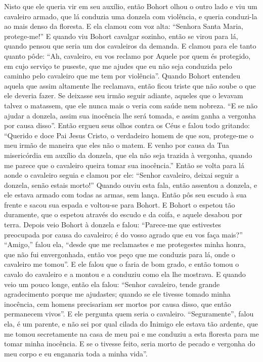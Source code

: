 Nisto que ele queria vir em seu auxílio, então Bohort olhou o outro lado e viu
um cavaleiro armado, que lá conduzia uma donzela com violência, e queria
conduzi-la ao mais denso da floresta. E ela clamou com voz alta: “Senhora Santa
Maria, protege-me!” E quando viu Bohort cavalgar sozinho, então se virou para
lá, quando pensou que seria um dos cavaleiros da demanda. E clamou para ele
tanto quanto pôde: “Ah, cavaleiro, eu vos reclamo por Aquele por quem és
protegido, em cujo serviço te puseste, que me ajudes que eu não seja conduzida
pelo caminho pelo cavaleiro que me tem por violência”. Quando Bohort entendeu
aquela que assim altamente lhe reclamava, então ficou triste que não soube o
que ele deveria fazer. Se deixasse seu irmão seguir adiante, aqueles que o
levavam talvez o matassem, que ele nunca mais o veria com saúde nem nobreza. “E
se não ajudar a donzela, assim sua inocência lhe será tomada, e assim ganha a
vergonha por causa disso”. Então ergueu seus olhos contra os Céus e falou todo
gritando: “Querido e doce Pai Jesus Cristo, o verdadeiro homem de que sou,
protege-me o meu irmão de maneira que eles não o matem. E venho por causa da
Tua misericórdia em auxílio da donzela, que ela não seja trazida à vergonha,
quando me parece que o cavaleiro queira tomar sua inocência.” Então se volta
para lá aonde o cavaleiro seguia e clamou por ele: “Senhor cavaleiro, deixai
seguir a donzela, senão estais morto!” Quando ouviu esta fala, então assentou
a donzela, e ele estava armado com todas as armas, sem lança. Então pôs seu
escudo à sua frente e sacou sua espada e voltou-se para Bohort. E Bohort o
espetou tão duramente, que o espetou através do escudo e da coifa, e aquele
desabou por terra. Depois veio Bohort à donzela e falou: “Parece-me que
estivestes preocupada por causa do cavaleiro; é do vosso agrado que eu vos faça
mais?” “Amigo,” falou ela, “desde que me reclamastes e me protegestes minha
honra, que não fui envergonhada, então vos peço que me conduzis para lá, onde o
cavaleiro me tomou”. E ele falou que o faria de bom grado, e então tomou o
cavalo do cavaleiro e a montou e a conduziu como ela lhe mostrava. E quando
veio um pouco longe, então ela falou: “Senhor cavaleiro, tende grande
agradecimento porque me ajudastes; quando se ele tivesse tomado minha
inocência, cem homens precisariam ser mortos por causa disso, que então
permanecem vivos”. E ele pergunta quem seria o cavaleiro. “Seguramente”, falou
ela, é um parente, e não sei por qual cilada do Inimigo ele estava tão ardente,
que me tomou secretamente na casa de meu pai e me conduziu a esta floresta para
me tomar minha inocência. E se o tivesse feito, seria morto de pecado e
vergonha do meu corpo e eu enganaria toda a minha vida”. 

